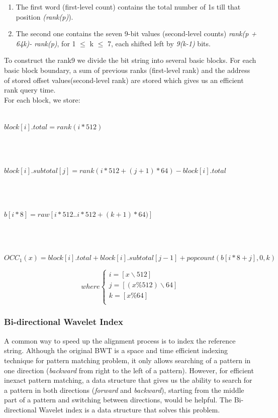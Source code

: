 \documentclass[11pt,a4paper]{report}
\begin{document}
\begin{enumerate}

	\item The first word (first-level count) contains the 
	total number of 1s till that position \emph{(rank(p)}).
	
	\item The second one contains the seven 9-bit values 
	(second-level counts) \emph{rank(p + 64k)- rank(p)}, 
	for 1 $\leq$ k $\leq$ 7, each shifted left by \emph
	{9(k-1)} bits.
	
\end{enumerate}

To construct the rank9  we divide the bit string into 
several basic blocks. For each basic block boundary, 
a sum of previous ranks (first-level rank) and the 
address of stored offset values(second-level rank) 
are stored which gives us an efficient rank query 
time. \\

For each block, we store:\\\\
\centerline{$ block[i].total= rank(i*512)$}\\\\
\centerline{$ block[i].subtotal[j]= rank(i*512 + (j+1)*64)-block[i].total$}\\\\
\centerline{$ b[i*8]=raw[i*512..i*512+(k+1)*64)] $}\\\\
\centerline{$ OCC_{1}(x)=block[i].total+block[i].subtotal[j-1]+popcount(b[i*8 + j],0,k)$}



\[ where
\begin{cases}
	i=[ x \backslash 512 ]\\
	j=[(x \% 512 )\backslash 64 ]\\
	k=[ x \% 64  ]\\
\end{cases}
\]




\subsubsection{Bi-directional Wavelet Index}
\label{Bi-directional Wavelet Index}

A common way to speed up the alignment process is to index the reference string. 
Although the original BWT is a space and time efficient indexing technique for 
pattern matching problem, it only allows  searching of a pattern in one 
direction (\emph{backward} from right to the left of a pattern). 
However, for efficient inexact pattern matching, a data structure that gives us 
the ability to search for a pattern in both directions (\emph{forward}
and \emph{backward}), 
starting from the middle part of a pattern and switching between
directions, would 
be helpful. The Bi-directional Wavelet index is a data structure that solves 
this problem.
\end{document}
